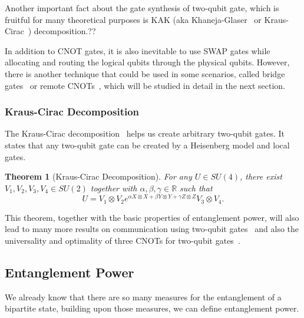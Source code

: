 \documentclass{report}
\newtheorem{theorem}{Theorem}
\begin{document}


Another important fact about the gate synthesis of two-qubit gate, which is fruitful for many theoretical purposes is KAK (aka Khaneja-Glaser~\cite{khaneja2001} or Kraus-Cirac~\cite{kraus2001}) decomposition.??

In addition to CNOT gates, it is also inevitable to use SWAP gates while allocating and routing the logical qubits through the physical qubits. However, there is another technique that could be used in some scenarios, called bridge gates~\cite{sivarajah2021,itoko2019,shende2006,siraichi2018} or remote CNOTs~\cite{zhou2020, nash2020}, which will be studied in detail in the next section.


\subsubsection{Kraus-Cirac Decomposition}

The Kraus-Cirac decomposition~\cite{kraus2001} helps us create arbitrary two-qubit gates. It states that any two-qubit gate can be created by a Heisenberg model and local gates.

\begin{theorem}[Kraus-Cirac Decomposition]
For any $U \in SU(4)$, there exist $V_1, V_2, V_3, V_4 \in SU(2)$ together with $\alpha, \beta, \gamma \in \mathbb{R}$ such that
\begin{equation}
  U = V_1 \otimes V_2 e^{\alpha X\otimes X + \beta Y\otimes Y + \gamma Z\otimes Z} V_3 \otimes V_4.
  \end{equation}
\end{theorem}

This theorem, together with the basic properties of entanglement power, will also lead to many more results on communication using two-qubit gates~\cite{berry2002} and also the universality and optimality of three CNOTs for two-qubit gates~\cite{vatan2004}.


\subsection{Entanglement Power}

We already know that there are so many measures for the entanglement of a bipartite state, building upon those measures, we can define entanglement power.
\end{document}
